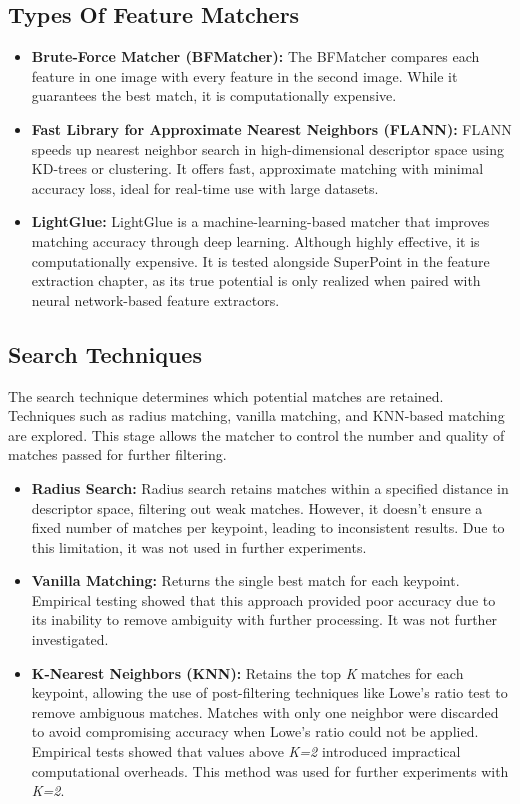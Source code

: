 \subsection*{Types Of Feature Matchers}


\begin{itemize}
    \item \textbf{Brute-Force Matcher (BFMatcher):}  
    The BFMatcher compares each feature in one image with every feature in the second image. While it guarantees the best match, it is computationally expensive.

    \item \textbf{Fast Library for Approximate Nearest Neighbors (FLANN):}  
    FLANN speeds up nearest neighbor search in high-dimensional descriptor space using KD-trees or clustering. It offers fast, approximate matching with minimal accuracy loss, ideal for real-time use with large datasets.

    \item \textbf{LightGlue:}  
    LightGlue is a machine-learning-based matcher that improves matching accuracy through deep learning. Although highly effective, it is computationally expensive. It is tested alongside SuperPoint in the feature extraction chapter, as its true potential is only realized when paired with neural network-based feature extractors. 
\end{itemize}

\subsection*{Search Techniques}
The search technique determines which potential matches are retained. Techniques such as radius matching, vanilla matching, and KNN-based matching are explored. This stage allows the matcher to control the number and quality of matches passed for further filtering.

\begin{itemize}
    \item \textbf{Radius Search:}  
    Radius search retains matches within a specified distance in descriptor space, filtering out weak matches. However, it doesn't ensure a fixed number of matches per keypoint, leading to inconsistent results. Due to this limitation, it was not used in further experiments.

    \item \textbf{Vanilla Matching:}  
    Returns the single best match for each keypoint. Empirical testing showed that this approach provided poor accuracy due to its inability to remove ambiguity with further processing. It was not further investigated.

    \item \textbf{K-Nearest Neighbors (KNN):}  
    Retains the top \textit{K} matches for each keypoint, allowing the use of post-filtering techniques like Lowe’s ratio test to remove ambiguous matches. Matches with only one neighbor were discarded to avoid compromising accuracy when Lowe’s ratio could not be applied. Empirical tests showed that values above \textit{K=2} introduced impractical computational overheads. This method was used for further experiments with \textit{K=2}.
\end{itemize}

